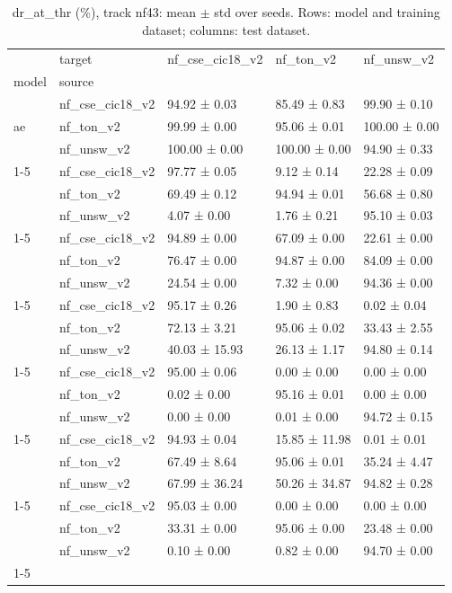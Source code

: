 \begin{table}
\caption{dr_at_thr (\%), track nf43: mean $\pm$ std over seeds. Rows: model and training dataset; columns: test dataset.}
\label{tab:matrix_nf43_dr_at_thr}
\begin{tabular}{lllll}
\toprule
 & target & nf_cse_cic18_v2 & nf_ton_v2 & nf_unsw_v2 \\
model & source &  &  &  \\
\midrule
\multirow[t]{3}{*}{ae} & nf_cse_cic18_v2 & 94.92 ± 0.03 & 85.49 ± 0.83 & 99.90 ± 0.10 \\
 & nf_ton_v2 & 99.99 ± 0.00 & 95.06 ± 0.01 & 100.00 ± 0.00 \\
 & nf_unsw_v2 & 100.00 ± 0.00 & 100.00 ± 0.00 & 94.90 ± 0.33 \\
\cline{1-5}
\multirow[t]{3}{*}{dt} & nf_cse_cic18_v2 & 97.77 ± 0.05 & 9.12 ± 0.14 & 22.28 ± 0.09 \\
 & nf_ton_v2 & 69.49 ± 0.12 & 94.94 ± 0.01 & 56.68 ± 0.80 \\
 & nf_unsw_v2 & 4.07 ± 0.00 & 1.76 ± 0.21 & 95.10 ± 0.03 \\
\cline{1-5}
\multirow[t]{3}{*}{lda} & nf_cse_cic18_v2 & 94.89 ± 0.00 & 67.09 ± 0.00 & 22.61 ± 0.00 \\
 & nf_ton_v2 & 76.47 ± 0.00 & 94.87 ± 0.00 & 84.09 ± 0.00 \\
 & nf_unsw_v2 & 24.54 ± 0.00 & 7.32 ± 0.00 & 94.36 ± 0.00 \\
\cline{1-5}
\multirow[t]{3}{*}{mlp} & nf_cse_cic18_v2 & 95.17 ± 0.26 & 1.90 ± 0.83 & 0.02 ± 0.04 \\
 & nf_ton_v2 & 72.13 ± 3.21 & 95.06 ± 0.02 & 33.43 ± 2.55 \\
 & nf_unsw_v2 & 40.03 ± 15.93 & 26.13 ± 1.17 & 94.80 ± 0.14 \\
\cline{1-5}
\multirow[t]{3}{*}{rf} & nf_cse_cic18_v2 & 95.00 ± 0.06 & 0.00 ± 0.00 & 0.00 ± 0.00 \\
 & nf_ton_v2 & 0.02 ± 0.00 & 95.16 ± 0.01 & 0.00 ± 0.00 \\
 & nf_unsw_v2 & 0.00 ± 0.00 & 0.01 ± 0.00 & 94.72 ± 0.15 \\
\cline{1-5}
\multirow[t]{3}{*}{tabnet} & nf_cse_cic18_v2 & 94.93 ± 0.04 & 15.85 ± 11.98 & 0.01 ± 0.01 \\
 & nf_ton_v2 & 67.49 ± 8.64 & 95.06 ± 0.01 & 35.24 ± 4.47 \\
 & nf_unsw_v2 & 67.99 ± 36.24 & 50.26 ± 34.87 & 94.82 ± 0.28 \\
\cline{1-5}
\multirow[t]{3}{*}{xgb} & nf_cse_cic18_v2 & 95.03 ± 0.00 & 0.00 ± 0.00 & 0.00 ± 0.00 \\
 & nf_ton_v2 & 33.31 ± 0.00 & 95.06 ± 0.00 & 23.48 ± 0.00 \\
 & nf_unsw_v2 & 0.10 ± 0.00 & 0.82 ± 0.00 & 94.70 ± 0.00 \\
\cline{1-5}
\bottomrule
\end{tabular}
\end{table}
